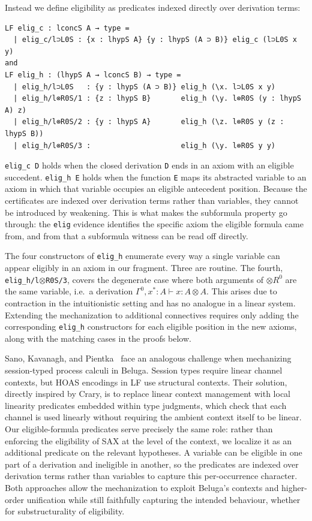 Instead we define eligibility as predicates indexed directly over
derivation terms:

\begin{lstlisting}
LF elig_c : lconcS A → type =
  | elig_c/l⊃L0S : {x : lhypS A} {y : lhypS (A ⊃ B)} elig_c (l⊃L0S x y)
and
LF elig_h : (lhypS A → lconcS B) → type =
  | elig_h/l⊃L0S   : {y : lhypS (A ⊃ B)} elig_h (\x. l⊃L0S x y)
  | elig_h/l⊗R0S/1 : {z : lhypS B}       elig_h (\y. l⊗R0S (y : lhypS A) z)
  | elig_h/l⊗R0S/2 : {y : lhypS A}       elig_h (\z. l⊗R0S y (z : lhypS B))
  | elig_h/l⊗R0S/3 :                     elig_h (\y. l⊗R0S y y)
\end{lstlisting}

\texttt{elig\_c~D} holds when the closed derivation \texttt{D} ends in
an axiom with an eligible succedent. \texttt{elig\_h~E} holds when the
function \texttt{E} maps its abstracted variable to an axiom in which
that variable occupies an eligible antecedent position. Because the
certificates are indexed over derivation terms rather than variables,
they cannot be introduced by weakening. This is what makes the
subformula property go through: the \texttt{elig} evidence identifies
the specific axiom the eligible formula came from, and from that a
subformula witness can be read off directly.

The four constructors of \texttt{elig\_h} enumerate every way a single
variable can appear eligibly in an axiom in our fragment. Three are
routine. The fourth, \texttt{elig\_h/l$\otimes$R0S/3}, covers the degenerate
case where both arguments of ${\otimes}R^0$ are the same variable, i.e.\
a derivation $\Gamma^0, x^* : A \vdash x : A \otimes A$. This arises
due to contraction in the intuitionistic setting and has no analogue in
a linear system. Extending the mechanization to additional connectives
requires only adding the corresponding \texttt{elig\_h} constructors for
each eligible position in the new axioms, along with the matching cases
in the proofs below.

Sano, Kavanagh, and Pientka~\cite{Sanomech} face an analogous challenge when
mechanizing session-typed process calculi in Beluga. Session types require linear
channel contexts, but HOAS encodings in LF use structural contexts. Their
solution, directly inspired by Crary, is to replace linear context management
with local linearity predicates embedded within type judgments, which
check that each channel is used linearly without requiring the ambient context
itself to be linear. Our eligible-formula predicates serve precisely the same
role: rather than enforcing the eligibility of SAX at the level of
the context, we localize it as an additional predicate on the relevant
hypotheses. A variable can be eligible in one part of a derivation and ineligible in another, so the predicates are indexed over derivation terms rather than variables to capture this per-occurrence character. Both approaches allow the mechanization to exploit Beluga's contexts and higher-order unification while still faithfully capturing
the intended  behaviour, whether for substructurality of eligibility.

